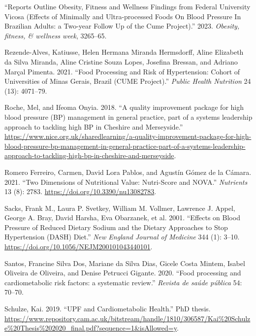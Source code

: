 \documentclass[
]{article}
\newlength{\cslhangindent}
\newlength{\cslentryspacingunit} %
\newenvironment{CSLReferences}[2] %
 {%
  \setlength{\parindent}{0pt}
  \ifodd #1
  \let\oldpar\par
  \def\par{\hangindent=\cslhangindent\oldpar}
  \fi
  \setlength{\parskip}{#2\cslentryspacingunit}
 }%
 {}
\begin{document}
\begin{CSLReferences}{1}{0}
\leavevmode{}%
{``Reports Outline Obesity, Fitness and Wellness Findings from Federal
University Vicosa (Effects of Minimally and Ultra-processed Foods On
Blood Pressure In Brazilian Adults: a Two-year Follow Up of the Cume
Project).''} 2023. \emph{Obesity, fitness, \& wellness week}, 3265--65.

\leavevmode{}%
Rezende-Alves, Katiusse, Helen Hermana Miranda Hermsdorff, Aline
Elizabeth da Silva Miranda, Aline Cristine Souza Lopes, Josefina
Bressan, and Adriano Marçal Pimenta. 2021. {``Food Processing and Risk
of Hypertension: {Cohort} of Universities of Minas Gerais, Brazil
({CUME} Project).''} \emph{Public Health Nutrition} 24 (13): 4071--79.

\leavevmode{}%
Roche, Mel, and Ifeoma Onyia. 2018. {``A quality improvement package for
high blood pressure (BP) management in general practice, part of a
systems leadership approach to tackling high BP in Cheshire and
Merseyside.''}
\url{https://www.nice.org.uk/sharedlearning/a-quality-improvement-package-for-high-blood-pressure-bp-management-in-general-practice-part-of-a-systems-leadership-approach-to-tackling-high-bp-in-cheshire-and-merseyside}.

\leavevmode{}%
Romero Ferreiro, Carmen, David Lora Pablos, and Agustín Gómez de la
Cámara. 2021. {``Two Dimensions of Nutritional Value: Nutri-Score and
NOVA.''} \emph{Nutrients} 13 (8): 2783.
\url{https://doi.org/10.3390/nu13082783}.

\leavevmode{}%
Sacks, Frank M., Laura P. Svetkey, William M. Vollmer, Lawrence J.
Appel, George A. Bray, David Harsha, Eva Obarzanek, et al. 2001.
{``Effects on Blood Pressure of Reduced Dietary Sodium and the Dietary
Approaches to Stop Hypertension (DASH) Diet.''} \emph{New England
Journal of Medicine} 344 (1): 3--10.
\url{https://doi.org/10.1056/NEJM200101043440101}.

\leavevmode{}%
Santos, Francine Silva Dos, Mariane da Silva Dias, Gicele Costa Mintem,
Isabel Oliveira de Oliveira, and Denise Petrucci Gigante. 2020. {``Food
processing and cardiometabolic risk factors: a systematic review.''}
\emph{Revista de saúde pública} 54: 70--70.

\leavevmode{}%
Schulze, Kai. 2019. {``UPF and Cardiometabolic Health.''} PhD thesis.
\url{https://www.repository.cam.ac.uk/bitstream/handle/1810/306587/Kai\%20Schulze\%20Thesis\%202020_final.pdf?sequence=1\&isAllowed=y}.


\end{CSLReferences}
\end{document}
